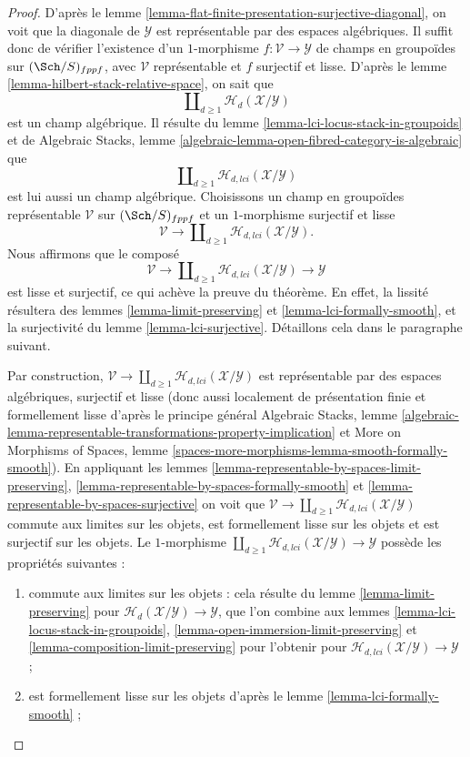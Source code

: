 \begin{proof}
D'après le
lemme \ref{lemma-flat-finite-presentation-surjective-diagonal},
on voit que la diagonale de $\mathcal{Y}$ est représentable par des espaces
algébriques. Il suffit donc de vérifier l'existence d'un $1$-morphisme
$f : \mathcal{V} \to \mathcal{Y}$ de champs en groupoïdes sur
$(\Sch/S)_{fppf}$, avec $\mathcal{V}$ représentable et
$f$ surjectif et lisse. D'après le
lemme \ref{lemma-hilbert-stack-relative-space},
on sait que
$$
\coprod\nolimits_{d \geq 1} \mathcal{H}_d(\mathcal{X}/\mathcal{Y})
$$
est un champ algébrique. Il résulte du
lemme \ref{lemma-lci-locus-stack-in-groupoids}
et de
Algebraic Stacks,
lemme \ref{algebraic-lemma-open-fibred-category-is-algebraic}
que
$$
\coprod\nolimits_{d \geq 1} \mathcal{H}_{d, lci}(\mathcal{X}/\mathcal{Y})
$$
est lui aussi un champ algébrique. Choisissons un champ en groupoïdes représentable
$\mathcal{V}$ sur $(\Sch/S)_{fppf}$ et un $1$-morphisme surjectif et
lisse
$$
\mathcal{V}
\longrightarrow
\coprod\nolimits_{d \geq 1} \mathcal{H}_{d, lci}(\mathcal{X}/\mathcal{Y}).
$$
Nous affirmons que le composé
$$
\mathcal{V}
\longrightarrow
\coprod\nolimits_{d \geq 1} \mathcal{H}_{d, lci}(\mathcal{X}/\mathcal{Y})
\longrightarrow
\mathcal{Y}
$$
est lisse et surjectif, ce qui achève la preuve du théorème. En effet,
la lissité résultera des
lemmes \ref{lemma-limit-preserving} et \ref{lemma-lci-formally-smooth},
et la surjectivité du
lemme \ref{lemma-lci-surjective}.
Détaillons cela dans le paragraphe suivant.

\medskip\noindent
Par construction, $\mathcal{V} \to
\coprod\nolimits_{d \geq 1} \mathcal{H}_{d, lci}(\mathcal{X}/\mathcal{Y})$
est représentable par des espaces algébriques, surjectif et lisse (donc
aussi localement de présentation finie et formellement lisse d'après le principe
général
Algebraic Stacks, lemme
\ref{algebraic-lemma-representable-transformations-property-implication}
et
More on Morphisms of Spaces,
lemme \ref{spaces-more-morphisms-lemma-smooth-formally-smooth}).
En appliquant les
lemmes \ref{lemma-representable-by-spaces-limit-preserving},
\ref{lemma-representable-by-spaces-formally-smooth} et
\ref{lemma-representable-by-spaces-surjective}
on voit que $\mathcal{V} \to
\coprod\nolimits_{d \geq 1} \mathcal{H}_{d, lci}(\mathcal{X}/\mathcal{Y})$
commute aux limites sur les objets, est formellement lisse sur les objets et
est surjectif sur les objets. Le $1$-morphisme
$\coprod\nolimits_{d \geq 1} \mathcal{H}_{d, lci}(\mathcal{X}/\mathcal{Y})
\to \mathcal{Y}$ possède les propriétés suivantes :
\begin{enumerate}
\item commute aux limites sur les objets : cela résulte du
lemme \ref{lemma-limit-preserving}
pour $\mathcal{H}_d(\mathcal{X}/\mathcal{Y}) \to \mathcal{Y}$,
que l'on combine aux lemmes
\ref{lemma-lci-locus-stack-in-groupoids},
\ref{lemma-open-immersion-limit-preserving} et
\ref{lemma-composition-limit-preserving}
pour l'obtenir pour $\mathcal{H}_{d, lci}(\mathcal{X}/\mathcal{Y}) \to \mathcal{Y}$ ;
\item est formellement lisse sur les objets d'après le
lemme \ref{lemma-lci-formally-smooth} ;


\end{enumerate}
\end{proof}
